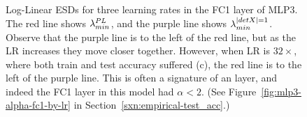 \begin{figure}[t] %
    \centering
    \caption{
        Log-Linear ESDs for three learning rates in the FC1 layer of MLP3. The red line shows $\lambda^{PL}_{min}$, and the 
        purple line shows $\lambda^{\vert detX\vert=1}_{min}$. Observe that the purple line is to the left of the red line, but as the LR 
        increases they move closer together. However, when LR is $32\times$, where both 
        train and test accuracy suffered (c), the red line is to the left of the purple line. This is often a signature 
        of an \OverRegularized layer, and indeed the FC1 layer in this model had $\alpha < 2$. (See Figure~\ref{fig:mlp3-alpha-fc1-by-lr} in 
        Section~\ref{sxn:empirical-test_acc}.)
    }
    \label{fig:mlp3-tracelognorm}
\end{figure}



